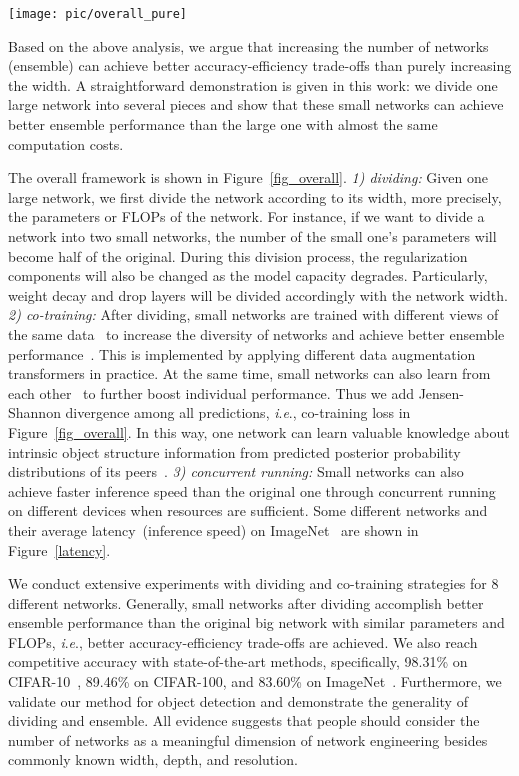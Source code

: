 \documentclass[lettersize,journal]{IEEEtran}
\newcommand{\ie}{\textit{i}.\textit{e}.}
\begin{document}
\begin{figure*}[tbp]
	\centering
	\small
	\texttt{[image: pic/overall\_pure]} 
	\caption{Left: divide one large network into several small ones and co-train.
		Right: concurrent running of small networks on different devices during inference.
	}
	\label{fig_overall}
\end{figure*}

Based on the above analysis, we argue that increasing the number of networks (ensemble)
can achieve better accuracy-efficiency trade-offs than purely increasing the width.
A straightforward demonstration is given in this work: we divide one large network
into several pieces and show that these small networks can achieve
better ensemble performance than the large one with almost the same computation costs.

The overall framework is shown in Figure~\ref{fig_overall}.
\emph{1) dividing:}
Given one large network, we first divide the network according
to its width, more precisely, the parameters or FLOPs of the network.
For instance, if we want to divide a network into two small networks, 
the number of the small one's parameters will become half of the original.
During this division process, the regularization components will
also be changed as the model capacity degrades.
Particularly, weight decay and drop layers will be divided
accordingly with the network width. 
\emph{2) co-training:}
After dividing,
small networks are trained with different views of the same
data~\cite{2018_QiaoSZWY18} to increase the diversity of networks
and achieve better ensemble performance~\cite{LiWD18}.
This is implemented by applying different data augmentation transformers in practice.
At the same time, small networks can also learn from
each other~\cite{2020_ICLR_MMT,2018_QiaoSZWY18,2018_CVPR_DML}
to further boost individual performance.
Thus we add Jensen-Shannon divergence among all predictions, \ie, 
co-training loss in Figure~\ref{fig_overall}.
In this way, one network can learn valuable knowledge about 
intrinsic object structure information from predicted posterior 
probability distributions of its peers~\cite{2015_HintonKD}.
\emph{3) concurrent running:}
Small networks can also achieve faster inference speed than the original one
through concurrent running on different devices when resources are sufficient.
Some different networks and their average latency~(inference speed) on
ImageNet~\cite{ImageNet} are shown in Figure~\ref{latency}.

We conduct extensive experiments with dividing and co-training
strategies for 8 different networks.
Generally, small networks after dividing accomplish better ensemble performance
than the original big network with similar parameters and FLOPs,
\ie, better accuracy-efficiency trade-offs are achieved.
We also reach competitive accuracy with state-of-the-art methods,
specifically, 98.31\% on CIFAR-10~\cite{cifar}, 89.46\% on CIFAR-100,
and 83.60\% on ImageNet~\cite{ImageNet}.
Furthermore, we validate our method for object detection
and demonstrate the generality of dividing and ensemble.
All evidence suggests that people should consider the number of networks
as a meaningful dimension of network engineering
besides commonly known width, depth, and resolution.
\end{document}
